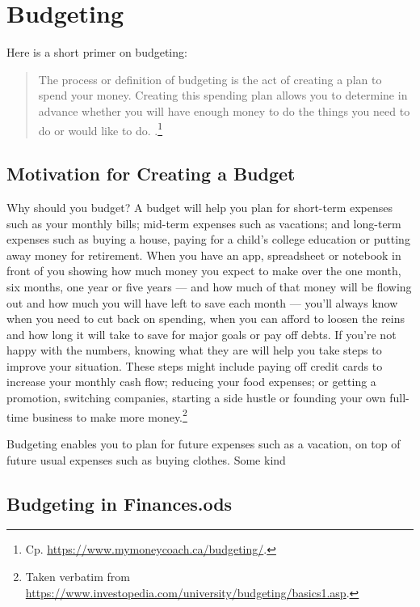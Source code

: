 \section{Budgeting}
\label{section:Budgeting}

Here is a short primer on budgeting:
\begin{quote}\small
	The process or definition of budgeting is the act of creating a plan to spend your money.
	Creating this spending plan allows you to determine in advance whether you will have enough money to do the things you need to do or would like to do. .\footnote{Cp. \url{https://www.mymoneycoach.ca/budgeting/}.}
\end{quote}

\subsection{Motivation for Creating a Budget}
\label{subsec:motivation-creating-budget}

Why should you budget? A budget will help you plan for short-term expenses such as your monthly bills; mid-term expenses such as vacations; and long-term expenses such as buying a house, paying for a child’s college education or putting away money for retirement.
When you have an app, spreadsheet or notebook in front of you showing how much money you expect to make over the one month, six months, one year or five years --- and how much of that money will be flowing out and how much you will have left to save each month --- you’ll always know when you need to cut back on spending, when you can afford to loosen the reins and how long it will take to save for major goals or pay off debts.
If you’re not happy with the numbers, knowing what they are will help you take steps to improve your situation.
These steps might include paying off credit cards to increase your monthly cash flow; reducing your food expenses; or getting a promotion, switching companies, starting a side hustle or founding your own full-time business to make more money.\footnote{Taken verbatim from \url{https://www.investopedia.com/university/budgeting/basics1.asp}.}

Budgeting enables you to plan for future expenses such as a vacation, on top of future usual expenses such as buying clothes.
Some kind 

\subsection{Budgeting in Finances.ods}
\label{subsec:budgeting-in-finances.ods}


